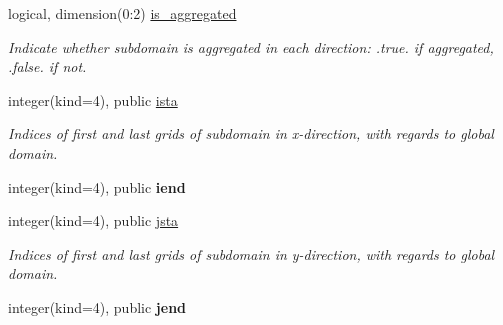 \textbf{ }\par
\begin{DoxyCompactItemize}
\item 
\mbox{\label{structgeometry_1_1subdomain_a17edfc7e8229d24f6223282092927d3e}} 
logical, dimension(0\+:2) \hyperlink{structgeometry_1_1subdomain_a17edfc7e8229d24f6223282092927d3e}{is\+\_\+aggregated}
\begin{DoxyCompactList}\small\item\em Indicate whether subdomain is aggregated in each direction\+: .true. if aggregated, .false. if not. \end{DoxyCompactList}\end{DoxyCompactItemize}

\textbf{ }\par
\begin{DoxyCompactItemize}
\item 
\mbox{\label{structgeometry_1_1subdomain_af7a157d3eedb654d163f6d25253f4798}} 
integer(kind=4), public \hyperlink{structgeometry_1_1subdomain_af7a157d3eedb654d163f6d25253f4798}{ista}
\begin{DoxyCompactList}\small\item\em Indices of first and last grids of subdomain in x-\/direction, with regards to global domain. \end{DoxyCompactList}\item 
\mbox{\label{structgeometry_1_1subdomain_a5b622d801fee0488b495d2e8cbac230d}} 
integer(kind=4), public {\bfseries iend}
\end{DoxyCompactItemize}

\textbf{ }\par
\begin{DoxyCompactItemize}
\item 
\mbox{\label{structgeometry_1_1subdomain_a06519313e1a87c437f9ca7e8325065d1}} 
integer(kind=4), public \hyperlink{structgeometry_1_1subdomain_a06519313e1a87c437f9ca7e8325065d1}{jsta}
\begin{DoxyCompactList}\small\item\em Indices of first and last grids of subdomain in y-\/direction, with regards to global domain. \end{DoxyCompactList}\item 
\mbox{\label{structgeometry_1_1subdomain_a7ad47076a641a35c16028c2a86e304b4}} 
integer(kind=4), public {\bfseries jend}
\end{DoxyCompactItemize}

